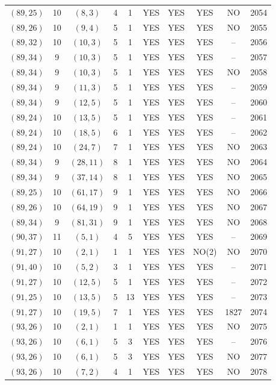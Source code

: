 \begin{longtable}{|c|c|c|c|c|c|c|c|c|c|}
$(89, 25)$ & 10 & $(8, 3)$ & 4 & 1 & YES & YES & YES & NO & 2054\\
$(89, 26)$ & 10 & $(9, 4)$ & 5 & 1 & YES & YES & YES & NO & 2055\\
$(89, 32)$ & 10 & $(10, 3)$ & 5 & 1 & YES & YES & YES & -- & 2056\\
$(89, 34)$ & 9 & $(10, 3)$ & 5 & 1 & YES & YES & YES & -- & 2057\\
$(89, 34)$ & 9 & $(10, 3)$ & 5 & 1 & YES & YES & YES & NO & 2058\\
$(89, 34)$ & 9 & $(11, 3)$ & 5 & 1 & YES & YES & YES & -- & 2059\\
$(89, 34)$ & 9 & $(12, 5)$ & 5 & 1 & YES & YES & YES & -- & 2060\\
$(89, 24)$ & 10 & $(13, 5)$ & 5 & 1 & YES & YES & YES & -- & 2061\\
$(89, 24)$ & 10 & $(18, 5)$ & 6 & 1 & YES & YES & YES & -- & 2062\\
$(89, 24)$ & 10 & $(24, 7)$ & 7 & 1 & YES & YES & YES & NO & 2063\\
$(89, 34)$ & 9 & $(28, 11)$ & 8 & 1 & YES & YES & YES & NO & 2064\\
$(89, 34)$ & 9 & $(37, 14)$ & 8 & 1 & YES & YES & YES & NO & 2065\\
$(89, 25)$ & 10 & $(61, 17)$ & 9 & 1 & YES & YES & YES & NO & 2066\\
$(89, 26)$ & 10 & $(64, 19)$ & 9 & 1 & YES & YES & YES & NO & 2067\\
$(89, 34)$ & 9 & $(81, 31)$ & 9 & 1 & YES & YES & YES & NO & 2068\\
$(90, 37)$ & 11 & $(5, 1)$ & 4 & 5 & YES & YES & YES & -- & 2069\\
$(91, 27)$ & 10 & $(2, 1)$ & 1 & 1 & YES & YES & NO(2) & NO & 2070\\
$(91, 40)$ & 10 & $(5, 2)$ & 3 & 1 & YES & YES & YES & -- & 2071\\
$(91, 27)$ & 10 & $(12, 5)$ & 5 & 1 & YES & YES & YES & -- & 2072\\
$(91, 25)$ & 10 & $(13, 5)$ & 5 & 13 & YES & YES & YES & -- & 2073\\
$(91, 27)$ & 10 & $(19, 5)$ & 7 & 1 & YES & YES & YES & 1827 & 2074\\
$(93, 26)$ & 10 & $(2, 1)$ & 1 & 1 & YES & YES & YES & NO & 2075\\
$(93, 26)$ & 10 & $(6, 1)$ & 5 & 3 & YES & YES & YES & -- & 2076\\
$(93, 26)$ & 10 & $(6, 1)$ & 5 & 3 & YES & YES & YES & NO & 2077\\
$(93, 26)$ & 10 & $(7, 2)$ & 4 & 1 & YES & YES & YES & NO & 2078\\

\end{longtable}
